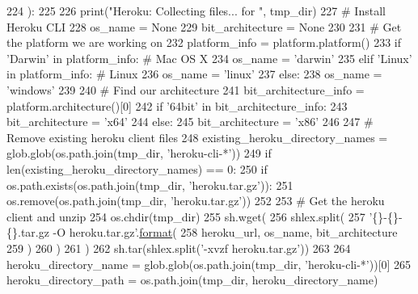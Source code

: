 \begin{DoxyCode}
224 ):
225 
226     print(\textcolor{stringliteral}{"Heroku: Collecting files... for "}, tmp\_dir)
227     \textcolor{comment}{# Install Heroku CLI}
228     os\_name = \textcolor{keywordtype}{None}
229     bit\_architecture = \textcolor{keywordtype}{None}
230 
231     \textcolor{comment}{# Get the platform we are working on}
232     platform\_info = platform.platform()
233     \textcolor{keywordflow}{if} \textcolor{stringliteral}{'Darwin'} \textcolor{keywordflow}{in} platform\_info:  \textcolor{comment}{# Mac OS X}
234         os\_name = \textcolor{stringliteral}{'darwin'}
235     \textcolor{keywordflow}{elif} \textcolor{stringliteral}{'Linux'} \textcolor{keywordflow}{in} platform\_info:  \textcolor{comment}{# Linux}
236         os\_name = \textcolor{stringliteral}{'linux'}
237     \textcolor{keywordflow}{else}:
238         os\_name = \textcolor{stringliteral}{'windows'}
239 
240     \textcolor{comment}{# Find our architecture}
241     bit\_architecture\_info = platform.architecture()[0]
242     \textcolor{keywordflow}{if} \textcolor{stringliteral}{'64bit'} \textcolor{keywordflow}{in} bit\_architecture\_info:
243         bit\_architecture = \textcolor{stringliteral}{'x64'}
244     \textcolor{keywordflow}{else}:
245         bit\_architecture = \textcolor{stringliteral}{'x86'}
246 
247     \textcolor{comment}{# Remove existing heroku client files}
248     existing\_heroku\_directory\_names = glob.glob(os.path.join(tmp\_dir, \textcolor{stringliteral}{'heroku-cli-*'}))
249     \textcolor{keywordflow}{if} len(existing\_heroku\_directory\_names) == 0:
250         \textcolor{keywordflow}{if} os.path.exists(os.path.join(tmp\_dir, \textcolor{stringliteral}{'heroku.tar.gz'})):
251             os.remove(os.path.join(tmp\_dir, \textcolor{stringliteral}{'heroku.tar.gz'}))
252 
253         \textcolor{comment}{# Get the heroku client and unzip}
254         os.chdir(tmp\_dir)
255         sh.wget(
256             shlex.split(
257                 \textcolor{stringliteral}{'\{\}-\{\}-\{\}.tar.gz -O heroku.tar.gz'}.\hyperlink{namespaceparlai_1_1chat__service_1_1services_1_1messenger_1_1shared__utils_a32e2e2022b824fbaf80c747160b52a76}{format}(
258                     heroku\_url, os\_name, bit\_architecture
259                 )
260             )
261         )
262         sh.tar(shlex.split(\textcolor{stringliteral}{'-xvzf heroku.tar.gz'}))
263 
264     heroku\_directory\_name = glob.glob(os.path.join(tmp\_dir, \textcolor{stringliteral}{'heroku-cli-*'}))[0]
265     heroku\_directory\_path = os.path.join(tmp\_dir, heroku\_directory\_name)

\end{DoxyCode}
